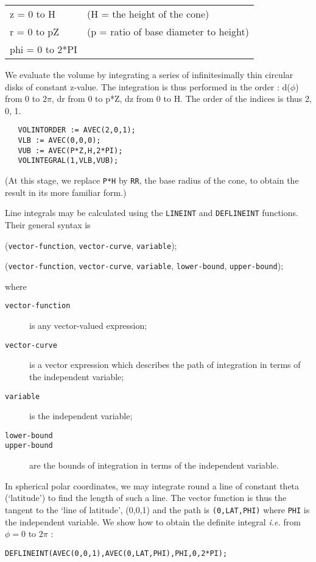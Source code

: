 \begin{tabular}{l l}
z = 0 to H  & (H = the height of the cone) \\
r = 0 to pZ & (p = ratio of base diameter to height) \\
phi = 0 to 2*PI & \\
\end{tabular}

We evaluate the volume by integrating a series of infinitesimally thin
circular disks of constant z-value. The integration is thus performed
in the order : d($\phi$) from 0 to $2\pi$, dr from 0 to p*Z, dz from 0 to H.
The order of the indices is thus 2, 0, 1.
\begin{verbatim}
   VOLINTORDER := AVEC(2,0,1);
   VLB := AVEC(0,0,0);
   VUB := AVEC(P*Z,H,2*PI);
   VOLINTEGRAL(1,VLB,VUB);
\end{verbatim}
(At this stage, we replace {\tt P*H} by {\tt RR}, the base radius of the cone,
to obtain the result in its more familiar form.)


 
 
Line integrals may be calculated using the {\tt LINEINT} and {\tt DEFLINEINT}
functions. Their general syntax is

({\tt vector-function}, {\tt vector-curve},
{\tt variable});

({\tt vector-function}, {\tt vector-curve},
{\tt variable}, {\tt lower-bound}, {\tt upper-bound});

\noindent where
\begin{description}
\item[{\tt vector-function}] is any vector-valued expression;
\item[{\tt vector-curve}] is a vector expression which describes the path of
integration in terms of the independent variable;
\item[{\tt variable}] is the independent variable;
\item[{\tt lower-bound}]
\item[{\tt upper-bound}] are the bounds of integration in terms of the
independent variable.
\end{description}

\example{}

In spherical polar coordinates, we may integrate round a line of
constant theta (`latitude') to find the length of such a line. The
vector function is thus the tangent to the `line of latitude', (0,0,1)
and the path is {\tt (0,LAT,PHI)} where {\tt PHI} is the independent
variable. We show how to obtain the definite integral {\em i.e.} from
$\phi=0$ to $2 \pi$ :
\begin{verbatim}
DEFLINEINT(AVEC(0,0,1),AVEC(0,LAT,PHI),PHI,0,2*PI);
\end{verbatim}

